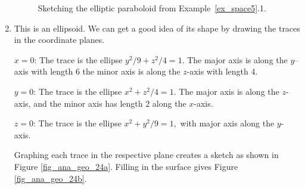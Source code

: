 \begin{example}
\begin{enumerate}[align=left]
	\begin{figure}[H]
\centering
\centerline{
\hspace{0.1cm}
}
\caption{Sketching the elliptic paraboloid from Example~\ref{ex_space5}.1.}
\end{figure}

	
	\item		This is an ellipsoid. We can get a good idea of its shape by drawing the traces in the coordinate planes.
	
	$x=0$: 	The trace is the ellipse $y^2/9+z^2/4=1$. The major axis is along the $y$--axis with length 6 the minor axis is along the $z$-axis with length 4.
	
	$y=0$:	The trace is the ellipse $ x^2+z^2/4=1.$ The major axis is along the $z$-axis, and the minor axis has length 2 along the $x$-axis.
	
	$z=0$:	The trace is the ellipse $ x^2+y^2/9=1,$ with major axis along the $y$-axis. 
	
	Graphing each trace in the respective plane creates a sketch as shown in Figure \ref{fig_ana_geo_24a}. Filling in the surface gives Figure \ref{fig_ana_geo_24b}.
	

\end{enumerate}
\end{example}
